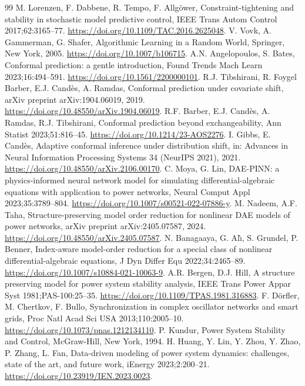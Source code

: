\documentclass[preprint,12pt]{elsarticle}
\begin{document}
\begin{thebibliography}{99}
 M. Lorenzen, F. Dabbene, R. Tempo, F. Allg{\"o}wer, Constraint-tightening and stability in stochastic model predictive control, IEEE Trans Autom Control 2017;62:3165--77. \url{https://doi.org/10.1109/TAC.2016.2625048}.
 V. Vovk, A. Gammerman, G. Shafer, Algorithmic Learning in a Random World, Springer, New York, 2005. \url{https://doi.org/10.1007/b106715}.
 A.N. Angelopoulos, S. Bates, Conformal prediction: a gentle introduction, Found Trends Mach Learn 2023;16:494--591. \url{https://doi.org/10.1561/2200000101}.
 R.J. Tibshirani, R. Foygel Barber, E.J. Cand{\`e}s, A. Ramdas, Conformal prediction under covariate shift, arXiv preprint arXiv:1904.06019, 2019. \url{https://doi.org/10.48550/arXiv.1904.06019}.
 R.F. Barber, E.J. Cand{\`e}s, A. Ramdas, R.J. Tibshirani, Conformal prediction beyond exchangeability, Ann Statist 2023;51:816--45. \url{https://doi.org/10.1214/23-AOS2276}.
 I. Gibbs, E. Cand{\`e}s, Adaptive conformal inference under distribution shift, in: Advances in Neural Information Processing Systems 34 (NeurIPS 2021), 2021. \url{https://doi.org/10.48550/arXiv.2106.00170}.
 C. Moya, G. Lin, DAE-PINN: a physics-informed neural network model for simulating differential-algebraic equations with application to power networks, Neural Comput Appl 2023;35:3789--804. \url{https://doi.org/10.1007/s00521-022-07886-y}.
 M. Nadeem, A.F. Taha, Structure-preserving model order reduction for nonlinear DAE models of power networks, arXiv preprint arXiv:2405.07587, 2024. \url{https://doi.org/10.48550/arXiv.2405.07587}.
 N. Banagaaya, G. Al{\`\i}, S. Grundel, P. Benner, Index-aware model-order reduction for a special class of nonlinear differential-algebraic equations, J Dyn Differ Equ 2022;34:2465--89. \url{https://doi.org/10.1007/s10884-021-10063-9}.
 A.R. Bergen, D.J. Hill, A structure preserving model for power system stability analysis, IEEE Trans Power Appar Syst 1981;PAS-100:25--35. \url{https://doi.org/10.1109/TPAS.1981.316883}.
 F. D{\"o}rfler, M. Chertkov, F. Bullo, Synchronization in complex oscillator networks and smart grids, Proc Natl Acad Sci USA 2013;110:2005--10. \url{https://doi.org/10.1073/pnas.1212134110}.
 P. Kundur, Power System Stability and Control, McGraw-Hill, New York, 1994.
 H. Huang, Y. Lin, Y. Zhou, Y. Zhao, P. Zhang, L. Fan, Data-driven modeling of power system dynamics: challenges, state of the art, and future work, iEnergy 2023;2:200--21. \url{https://doi.org/10.23919/IEN.2023.0023}.

\end{thebibliography}
\end{document}
